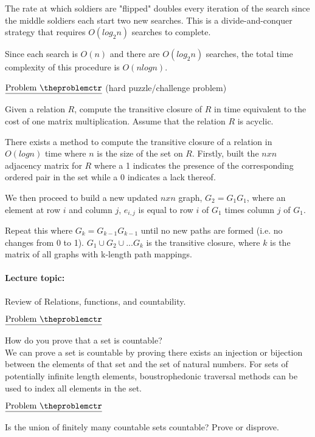 \documentclass[11pt]{article}
\def\pp{\par\noindent}
\begin{document}
The rate at which soldiers are "flipped" doubles every iteration of the search since the middle soldiers each start two new searches. This is a divide-and-conquer strategy that requires $O(log_2n)$ searches to complete.

Since each search is $O(n)$ and there are $O(log_2n)$ searches, the total time complexity of this procedure is $O(nlogn)$.


\addtocounter{problemctr}{1}
\bigskip
\noindent
$\underline{\rm Problem\ \theproblemctr}$ (hard puzzle/challenge problem)\pp

\noindent
Given a relation $R$, compute the transitive closure of $R$ in time equivalent to the cost of one matrix multiplication. Assume that the relation $R$ is acyclic.


There exists a method to compute the transitive closure of a relation in $O(logn)$ time where $n$ is the size of the set on $R$. Firstly, built the $nxn$ adjacency matrix for $R$ where a 1 indicates the presence of the corresponding ordered pair in the set while a 0 indicates a lack thereof.

We then proceed to build a new updated $nxn$ graph, $G_2=G_1G_1$, where an element at row $i$ and column $j$, $e_{i,j}$ is equal to row $i$ of $G_1$ times column $j$ of $G_1$.

Repeat this where $G_k=G_{k-1}G_{k-1}$ until no new paths are formed (i.e. no changes from 0 to 1). $G_1 \cup G_2 \cup ... G_k$ is the transitive closure, where $k$ is the matrix of all graphs with k-length path mappings.



\paragraph{Lecture topic: }  Review of Relations, functions, and countability.


\addtocounter{problemctr}{1}
\bigskip
\noindent
$\underline{\rm Problem\ \theproblemctr}$ \pp
How do you prove that a set is countable?\\

We can prove a set is countable by proving there exists an injection or bijection between the elements of that set and the set of natural numbers. For sets of potentially infinite length elements, boustrophedonic traversal methods can be used to index all elements in the set.\\

\addtocounter{problemctr}{1}
\bigskip
\noindent
$\underline{\rm Problem\ \theproblemctr}$ \pp
Is the union of finitely many countable sets countable? Prove or disprove.
\end{document}
